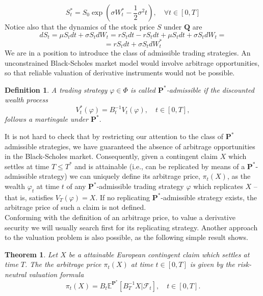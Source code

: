 \documentclass{book}
\newtheorem{definition}{Definition}[section]
\newtheorem{theorem}{Theorem}[section]
\begin{document}
\begin{equation}
S^{\ast}_{t}=S_{0}\exp(\sigma W^{\ast}_{t}-\frac{1}{2}\sigma^{2}t),\quad \forall t\in[0,T]
\end{equation}
Notice also that the dynamics of the stock price $S$ under $\mathbf{Q}$ are
\begin{equation}
dS_{t}=\mu S_{t}dt+\sigma S_{t}dW_{t}=rS_{t}dt-rS_{t}dt+\mu S_{t}dt+\sigma S_{t}dW_{t}=
\end{equation}
$$
=rS_{t}dt+\sigma S_{t}dW^{\ast}_{t}
$$
We are in a position to introduce the class of admissible trading strategies. An unconstrained Black-Scholes market model would involve arbitrage opportunities, so that reliable valuation of derivative instruments would not be possible.
\begin{definition}
A trading strategy $\varphi\in \Phi$ is called $\mathbf{P^{\ast}}$-admissible if the discounted wealth process 
$$
V_{t}^{\ast}(\varphi)=B_{t}^{-1}V_{t}(\varphi),\quad t\in[0,T],
$$ 
follows a martingale under $\mathbf{P^{\ast}}.$
\end{definition}
It is not hard to check that by restricting our attention to the class of $\mathbf{P^{\ast}}$ admissible strategies, we have guaranteed the absence of arbitrage opportunities in the Black-Scholes market. Consequently, given a contingent claim $X$ which settles at time $T\leq T^{\ast}$ and is attainable (i.e., can be replicated by means of a $\mathbf{P^{\ast}}$-admissible strategy) we can uniquely define its arbitrage price, $\pi_{t}(X)$, as the wealth $\varphi_{t}$ at time $t$ of any $\mathbf{P^{\ast}}$-admissible trading strategy $\varphi$ which replicates $X$ – that is, satisfies
$V_{T}(\varphi)=X$. If no replicating $\mathbf{P^{\ast}}$-admissible strategy exists, the arbitrage price of such a claim is not defined.\\
Conforming with the definition of an arbitrage price, to value a derivative security we will usually
search first for its replicating strategy. Another approach to the valuation problem is also possible, as the following simple result shows.
\begin{theorem}
Let $X$ be a attainable European contingent claim which settles at time $T$. The the arbitrage price $\pi_{t}(X)$ at time $t\in[0,T]$ is given by the risk-neutral valuation formula
$$
\pi_{t}(X)=B_{t}\mathbb{E}^{\mathbf{P^{\ast}}}\left[B_{T}^{-1}X|\mathcal{F}_{t} \right],\quad t\in[0,T].
$$ 
\end{theorem}
\end{document}
